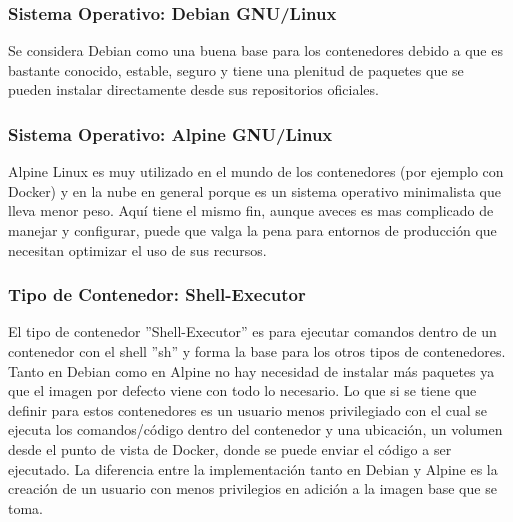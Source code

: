 \subsubsection{Sistema Operativo: Debian GNU/Linux}
Se considera Debian como una buena base para los contenedores debido a que es bastante conocido, estable, seguro y tiene una plenitud de paquetes que se pueden instalar directamente desde sus repositorios oficiales.

\subsubsection{Sistema Operativo: Alpine GNU/Linux}
Alpine Linux es muy utilizado en el mundo de los contenedores (por ejemplo con Docker) y en la nube en general porque es un sistema operativo minimalista que lleva menor peso. Aquí tiene el mismo fin, aunque aveces es mas complicado de manejar y configurar, puede que valga la pena para entornos de producción que necesitan optimizar el uso de sus recursos.

\subsubsection{Tipo de Contenedor: Shell-Executor}
El tipo de contenedor ''Shell-Executor'' es para ejecutar comandos dentro de un contenedor con el shell ''sh'' y forma la base para los otros tipos de contenedores. Tanto en Debian como en Alpine no hay necesidad de instalar más paquetes ya que el imagen por defecto viene con todo lo necesario. Lo que si se tiene que definir para estos contenedores es un usuario menos privilegiado con el cual se ejecuta los comandos/código dentro del contenedor y una ubicación, un volumen desde el punto de vista de Docker, donde se puede enviar el código a ser ejecutado. La diferencia entre la implementación tanto en Debian y Alpine es la creación de un usuario con menos privilegios en adición a la imagen base que se toma. 


